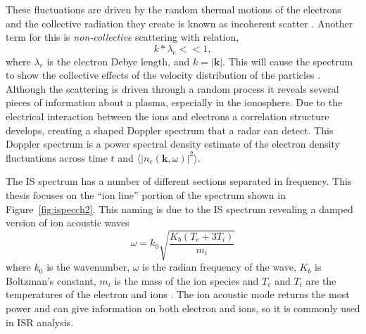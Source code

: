 These fluctuations are driven by the random thermal motions of the electrons and the collective radiation they create is known as incoherent scatter \cite{kudeki:milla:1}. Another term for this is \textit{non-collective} scattering with relation,
\begin{equation}
\label{eqn:incohorig}
k*\lambda_{e} << 1,
\end{equation}
where $\lambda_{e}$ is the electron Debye length, and $k=|\mathbf{k}|$. This will cause the spectrum to show the collective effects of the velocity distribution of the particles \cite{sheffield2010}.
Although the scattering is driven through a random process it reveals several pieces of information about a plasma, especially in the ionosphere. Due to the electrical interaction between the ions and electrons a correlation structure develops, creating a shaped Doppler spectrum that a radar can detect. This Doppler spectrum is a power spectral density estimate of the electron density fluctuations across time $t$ and $\langle \left|n_e(\mathbf{k},\omega)\right|^2\rangle$.

The IS spectrum has a number of different sections separated in frequency.
This thesis focuses on the ``ion line'' portion of the spectrum shown in Figure~\ref{fig:ispecch2}. This naming is due to the IS spectrum revealing a damped version of ion acoustic waves
\begin{equation} 
\label{eqn:ial}
\omega=k_0\sqrt{\frac{K_b(T_e+3T_i)}{m_i}}
\end{equation}
where $k_0$ is the wavenumber, $\omega$ is the radian frequency of the wave, $K_b$ is Boltzman's constant, $m_i$ is the mass of the ion species and $T_e$ and $T_i$ are the temperatures of the electron and ions \cite{chen1984introduction}. 
The ion acoustic mode returns the most power and can give information on both electron and ions, so it is commonly used in ISR analysis.


